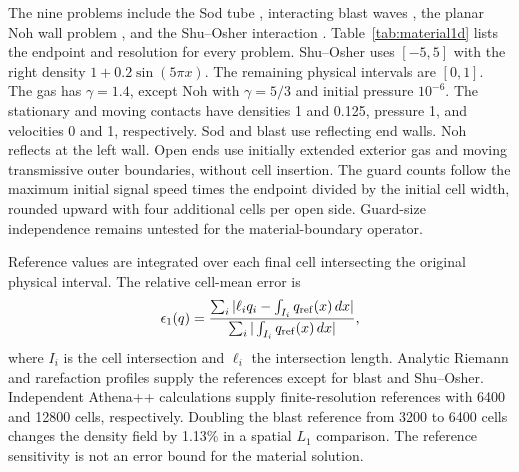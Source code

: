 \documentclass[twocolumn]{aastex63}
\begin{document}
The nine problems include the Sod tube \citep{sod1978}, interacting blast
waves \citep{WoodwardColella1984}, the planar Noh wall problem
\citep{Noh1987}, and the Shu--Osher interaction \citep{ShuOsher1989}.
Table~\ref{tab:material1d} lists the endpoint and resolution for every
problem. Shu--Osher uses $[-5,5]$ with the right density
$1+0.2\sin(5\pi x)$. The remaining physical intervals are $[0,1]$.
The gas has $\gamma=1.4$, except Noh with $\gamma=5/3$ and initial
pressure $10^{-6}$. The stationary and moving contacts have densities
1 and 0.125, pressure 1, and velocities 0 and 1, respectively.
Sod and blast use reflecting end walls. Noh reflects at the left wall.
Open ends use initially extended exterior gas and moving transmissive outer
boundaries, without cell insertion. The guard counts follow the maximum
initial signal speed times the endpoint divided by the initial cell width,
rounded upward with four additional cells per open side. Guard-size
independence remains untested for the material-boundary operator.

Reference values are integrated over each final cell intersecting the
original physical interval. The relative cell-mean error is
\begin{equation}
 \epsilon_1(q)=
 {\sum_i|\ell_i q_i-\int_{I_i}q_{\rm ref}(x)\,dx|
  \over\sum_i|\int_{I_i}q_{\rm ref}(x)\,dx|},
 \label{eq:material_error}
\end{equation}
where $I_i$ is the cell intersection and $\ell_i$ the intersection length.
Analytic Riemann and rarefaction profiles supply the references except for
blast and Shu--Osher. Independent Athena++ calculations
\citep{Stone2020} supply finite-resolution references with 6400 and 12800
cells, respectively. Doubling the blast reference from 3200 to 6400 cells
changes the density field by 1.13\% in a spatial $L_1$ comparison.
The reference sensitivity is not an error bound for the material solution.
\end{document}
